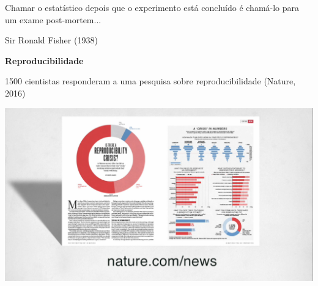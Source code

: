 \documentclass{beamer}
\begin{document}
\begin{frame}
  \begin{block}{}
    Chamar o estatístico depois que o experimento está concluído é chamá-lo para um exame post-mortem...

\bigskip
{}
  \end{block}
\hfill Sir Ronald Fisher (1938)
\end{frame}

\begin{frame}
  \begin{center}
    {\bf Reproducibilidade}
  \end{center}
\end{frame}

\begin{frame}
  1500 cientistas responderam a uma pesquisa sobre reproducibilidade (Nature, 2016)

\includegraphics[width=\textwidth]{Imagens/reprod-nature3}
\end{frame}
\end{document}
